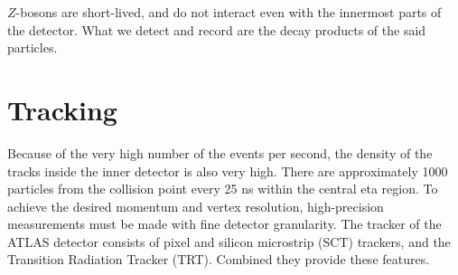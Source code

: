 $Z$-bosons are short-lived, and do not interact even with the innermost parts of the detector. What we detect and record are the decay products of the said particles.

\section{Tracking}
\label{sec:ATLAS_tracker}

Because of the very high number of the events per second, the density of the tracks inside the inner detector is also very high. There are approximately 1000 particles from the collision point every 25 ns within the central eta region. To achieve the desired momentum and vertex resolution, high-precision measurements must be made with fine detector granularity. The tracker of the ATLAS detector consists of pixel and silicon microstrip (SCT) trackers, and the Transition Radiation Tracker (TRT). Combined they provide these features.

\begin{figure}
\end{figure}

